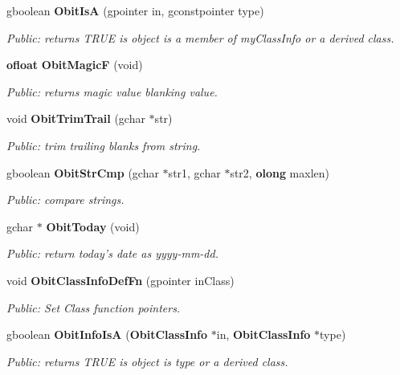 \begin{CompactItemize}
gboolean {\bf Obit\-Is\-A} (gpointer in, gconstpointer type)
\begin{CompactList}\small\item\em Public: returns TRUE is object is a member of my\-Class\-Info or a derived class. \item\end{CompactList}\item 
{\bf ofloat} {\bf Obit\-Magic\-F} (void)
\begin{CompactList}\small\item\em Public: returns magic value blanking value. \item\end{CompactList}\item 
void {\bf Obit\-Trim\-Trail} (gchar $\ast$str)
\begin{CompactList}\small\item\em Public: trim trailing blanks from string. \item\end{CompactList}\item 
gboolean {\bf Obit\-Str\-Cmp} (gchar $\ast$str1, gchar $\ast$str2, {\bf olong} maxlen)
\begin{CompactList}\small\item\em Public: compare strings. \item\end{CompactList}\item 
gchar $\ast$ {\bf Obit\-Today} (void)
\begin{CompactList}\small\item\em Public: return today's date as yyyy-mm-dd. \item\end{CompactList}\item 
void {\bf Obit\-Class\-Info\-Def\-Fn} (gpointer in\-Class)
\begin{CompactList}\small\item\em Public: Set Class function pointers. \item\end{CompactList}\item 
gboolean {\bf Obit\-Info\-Is\-A} ({\bf Obit\-Class\-Info} $\ast$in, {\bf Obit\-Class\-Info} $\ast$type)
\begin{CompactList}\small\item\em Public: returns TRUE is object is type or a derived class. \item\end{CompactList}\end{CompactItemize}


